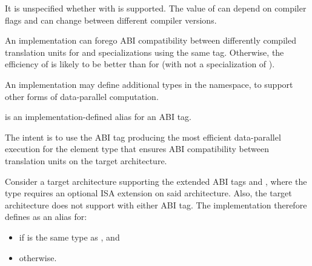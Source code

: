 \pnum
\begin{note}It is unspecified whether  with  is supported. The value of  can depend on compiler flags and can change between different compiler versions.\end{note}

\pnum
\begin{note}An implementation can forego ABI compatibility between differently compiled translation units for  and  specializations using the same  tag. Otherwise, the efficiency of  is likely to be better than for  (with  not a specialization of ).\end{note}

\pnum
An implementation may define additional  types in the  namespace, to support other forms of data-parallel computation.

\pnum
{} is an implementation-defined alias for an ABI tag. \begin{note}The intent is to use the ABI tag producing the most efficient data-parallel execution for the element type  that ensures ABI compatibility between translation units on the target architecture.\end{note}
\begin{example}
  Consider a target architecture supporting the extended ABI tags  and , where the  type requires an optional ISA extension on said architecture. Also, the target architecture does not support  with either ABI tag. The implementation therefore defines  as an alias for:
  \begin{itemize}
    \item {} if  is the same type as , and
    \item {} otherwise.
  \end{itemize}
\end{example}

